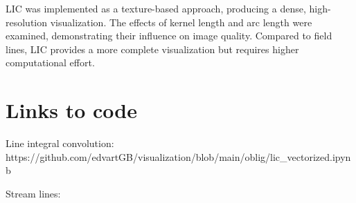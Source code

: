 \documentclass{article}
\begin{document}
LIC was implemented as a texture-based approach, producing a dense, high-resolution visualization. The effects of kernel length and arc length were examined, demonstrating their influence on image quality. Compared to field lines, LIC provides a more complete visualization but requires higher computational effort.


\section*{Links to code}
Line integral convolution: https://github.com/edvartGB/visualization/blob/main/oblig/lic_vectorized.ipynb

Stream lines: 
\end{document}
